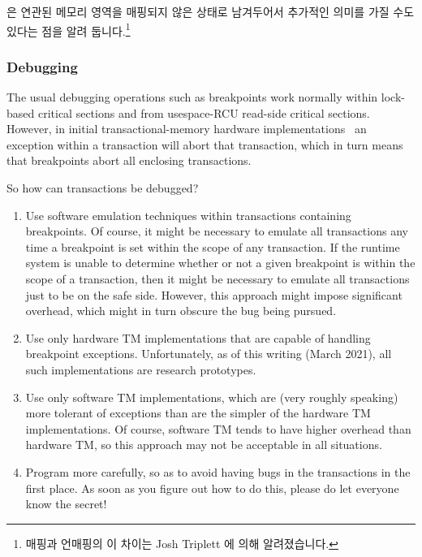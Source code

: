 \begin{enumerate}
\fi

\end{enumerate}

 은 연관된 메모리 영역을 매핑되지 않은 상태로 남겨두어서 추가적인
의미를 가질 수도 있다는 점을 알려 둡니다.\footnote{
	매핑과 언매핑의 이 차이는 Josh Triplett 에 의해 알려졌습니다.}

\subsubsection{Debugging}
\label{sec:future:Debugging}

The usual debugging operations such as breakpoints work normally within
lock-based critical sections and from usespace-RCU read-side critical sections.
However, in initial transactional-memory hardware
implementations~\cite{DaveDice2009ASPLOSRockHTM} an exception within
a transaction will abort that transaction, which in turn means that
breakpoints abort all enclosing transactions.

So how can transactions be debugged?

\begin{enumerate}
\item	Use software emulation techniques within transactions containing
	breakpoints.
	Of course, it might be necessary to emulate all transactions
	any time a breakpoint is set within the scope of any transaction.
	If the runtime system is unable to determine whether or not a
	given breakpoint is within the scope of a transaction, then it
	might be necessary to emulate all transactions just to be on
	the safe side.
	However, this approach might impose significant overhead, which
	might in turn obscure the bug being pursued.
\item	Use only hardware TM implementations that are capable of
	handling breakpoint exceptions.
	Unfortunately, as of this writing (March 2021), all such
	implementations are research prototypes.
\item	Use only software TM implementations, which are
	(very roughly speaking) more tolerant of exceptions than are
	the simpler of the hardware TM implementations.
	Of course, software TM tends to have higher overhead than hardware
	TM, so this approach may not be acceptable in all situations.
\item	Program more carefully, so as to avoid having bugs in the
	transactions in the first place.
	As soon as you figure out how to do this, please do let everyone
	know the secret!
\end{enumerate}

